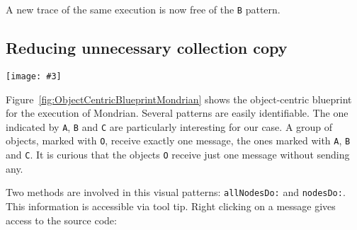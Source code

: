 \documentclass{sig-alternate}
\newcommand{\ct}{\lstinline[backgroundcolor=\color{white},basicstyle=\footnotesize\ttfamily]}
\newcommand{\largefig}[4]{
	\begin{figure*}[#1]
		\centering
		\texttt{[image: \#3]}
		\caption{\label{fig:#3}#4}
	\end{figure*}}
\newcommand{\figref}[1]{Figure~\ref{fig:#1}}
\begin{document}
A new trace of the same execution is now free of the \ct{B} pattern.

%
%
%

\subsection{Reducing unnecessary collection copy}

\largefig{}{1.0}{ObjectCentricBlueprintMondrian}{Sequence Tree Layout}

\figref{ObjectCentricBlueprintMondrian} shows the object-centric blueprint for the execution of Mondrian. Several patterns are easily identifiable. The one indicated by \ct{A}, \ct{B} and \ct{C} are particularly interesting for our case. A group of objects, marked with \ct{O}, receive exactly one message, the ones marked with \ct{A}, \ct{B} and \ct{C}. It is curious that the objects \ct{O} receive just one message without sending any.

Two methods are involved in this visual patterns: \ct{allNodesDo:} and \ct{nodesDo:}. This information is accessible via tool tip. Right clicking on a message gives access to the source code:
\end{document}
